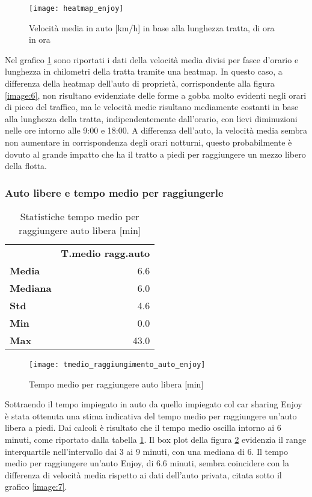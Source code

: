 \begin{figure}[H]
	\texttt{[image: heatmap\_enjoy]}
	\caption{Velocità media in auto [km/h] in base alla lunghezza tratta, di ora in ora}
	\label{image:30}
\end{figure}

Nel grafico \ref{image:30} sono riportati i dati della velocità media divisi per fasce d'orario e lunghezza in chilometri della tratta tramite una heatmap. In questo caso, a differenza della heatmap dell'auto di proprietà, corrispondente alla figura \ref{image:6}, non risultano evidenziate delle forme a gobba molto evidenti negli orari di picco del traffico, ma le velocità medie risultano mediamente costanti in base alla lunghezza della tratta, indipendentemente dall'orario, con lievi diminuzioni nelle ore intorno alle 9:00 e 18:00. A differenza dell'auto, la velocità media sembra non aumentare in corrispondenza degli orari notturni, questo probabilmente è dovuto al grande impatto che ha il tratto a piedi per raggiungere un mezzo libero della flotta.

\subsubsection{Auto libere e tempo medio per raggiungerle}

\begin{table}[H]
\centering
\begin{tabular}{ | l r | }
\hline
& \textbf{T.medio ragg.auto} \\
\textbf{Media}   &  6.6 \\
\textbf{Mediana} &  6.0 \\
\textbf{Std}     &  4.6 \\
\textbf{Min}     &  0.0 \\ 
\textbf{Max}     & 43.0 \\
\hline
\end{tabular}
\caption{Statistiche tempo medio per raggiungere auto libera [min]}
\label{table:4}
\end{table}

\begin{figure}[H]
	\texttt{[image: tmedio\_raggiungimento\_auto\_enjoy]}
	\caption{Tempo medio per raggiungere auto libera [min]}
	\label{image:8}
\end{figure}

Sottraendo il tempo impiegato in auto da quello impiegato col car sharing Enjoy è stata ottenuta una stima indicativa del tempo medio per raggiungere un'auto libera a piedi. Dai calcoli è risultato che il tempo medio oscilla intorno ai 6 minuti, come riportato dalla tabella \ref{table:4}. Il box plot della figura \ref{image:8} evidenzia il range interquartile nell'intervallo dai 3 ai 9 minuti, con una mediana di 6. Il tempo medio per raggiungere un'auto Enjoy, di 6.6 minuti, sembra coincidere con la differenza di velocità media rispetto ai dati dell'auto privata, citata sotto il grafico \ref{image:7}.

